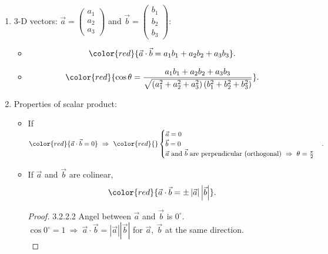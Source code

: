 \documentclass[12pt, a4paper]{article}
\begin{document}
\begin{enumerate}
\begin{itemize}
\begin{proof}{3.2.2.1}{}
$$\begin{aligned}
        \left|\vec{b}\right|^2-2\vec{a}\vec{b}+\left|\vec{a}\right|^2&=\left|\vec{a}\right|^2+\left|\vec{b}\right|^2-2\left|\vec{a}\right|\left|\vec{b}\right|\cos\theta\\
        \therefore \vec{a}\cdot\vec{b}&=\left|\vec{a}\right|\left|\vec{b}\right|\cos\theta.
      \end{aligned}$$
    \end{proof}
    \item Combining the two definitions: 
    $${\color{red}{\cos\theta=\frac{a_1b_1+a_2b_2}{\sqrt{\left(a_1^2+a_2^2\right)\left(b_1^2+b_2^2\right)}}}}.$$
  \end{itemize}
  \item 3-D vectors: $\vec{a}=\begin{pmatrix}a_1\\a_2\\a_3\end{pmatrix}$ and $\vec{b}=\begin{pmatrix}b_1\\b_2\\b_3\end{pmatrix}$: 
  \begin{itemize}
    \item $${\color{red}{\vec{a}\cdot\vec{b}=a_1b_1+a_2b_2+a_3b_3}}.$$
    \item $${\color{red}{\cos\theta=\frac{a_1b_1+a_2b_2+a_3b_3}{\sqrt{\left(a_1^2+a_2^2+a_3^2\right)\left(b_1^2+b_2^2+b_3^2\right)}}}}.$$
  \end{itemize}
  \item Properties of scalar product: 
  \begin{itemize}
    \item If ${\color{red}{\vec{a}\cdot\vec{b}=0}}\ \Rightarrow\ {\color{red}{}\begin{cases}\vec{a}=0\\\vec{b}=0\\\vec{a}\text{ and }\vec{b}\text{ are perpendicular (orthogonal)}\ \Rightarrow\ \theta=\frac{\pi}{2}\end{cases}}.$
    \item If $\vec{a}$ and $\vec{b}$ are colinear, $${\color{red}{\vec{a}\cdot\vec{b}=\pm\left|\vec{a}\right|\left|\vec{b}\right|}}.$$
    \begin{proof}{3.2.2.2}{}
      Angel between $\vec{a}$ and $\vec{b}$ is $0^\circ$.\\
      $\cos0^\circ=1\ \Rightarrow\ \vec{a}\cdot\vec{b}=\left|\vec{a}\right|\left|\vec{b}\right|$ for $\vec{a},\ \vec{b}$ at the same direction.\\

\end{proof}
\end{itemize}
\end{enumerate}
\end{document}
